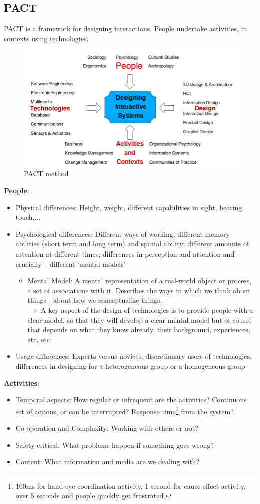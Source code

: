 \subsection{PACT}
PACT is a framework for designing interactions. People undertake activities, in contexts using technologies.\\
\begin{figure}[h!]
			\centering
			\includegraphics[width=.6\textwidth]{img/ch01_pact.png}
			\caption{PACT method}
			\label{pact}
\end{figure} 
\textbf{People}:
\begin{itemize}
\item Physical differences: Height, weight, different capabilities in sight, hearing, touch,...
\item Psychological differences: Different ways of working; different memory abilities (short term and long term) and spatial ability; different amounts of attention at different times; differences in perception and attention and -- crucially -- different `mental models' 
\begin{itemize}
\item Mental Model: A mental representation of a real-world object or process, a set of associations with it. Describes the ways in which we think about things - about how we conceptualize things.\\
$\rightarrow$ A key aspect of the design of technologies is to provide people with a clear model, so that they will develop a clear mental model but of course that depends on what they know already, their background, experiences, etc. etc.
\end{itemize}
\item Usage differences: Experts versus novices, discretionary users of technologies, differences in designing for a heterogeneous group or a homogeneous group
\end{itemize}
\textbf{Activities}:
\begin{itemize}
\item Temporal aspects: How regular or infrequent are the activities? Continuous set of actions, or can be interrupted? Response time\footnote{100ms for hand-eye coordination activity, 1 second for cause-effect activity, over 5 seconds and people quickly get frustrated.} from the system?
\item Co-operation and Complexity: Working with others or not?
\item Safety critical: What problems happen if something goes wrong?
\item Content: What information and media are we dealing with?
\end{itemize}
